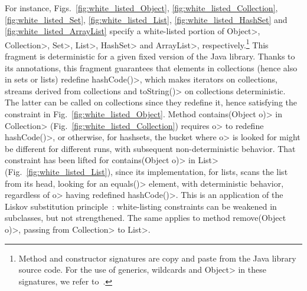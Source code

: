 For instance, Figs.~\ref{fig:white_listed_Object}, \ref{fig:white_listed_Collection},
\ref{fig:white_listed_Set}, \ref{fig:white_listed_List},
\ref{fig:white_listed_HashSet} and \ref{fig:white_listed_ArrayList}
specify a white-listed portion of \<Object>,
\<Collection>, \<Set>, \<List>, \<HashSet> and \<ArrayList>,
respectively.\footnote{Method and constructor signatures are copy and paste from the
Java library source code. For the use of generics, wildcards and
\<Object> in these signatures, we refer to~\cite{NaftalinW06}.}
This fragment is deterministic for a given fixed version of the Java library.
Thanks to its annotations, this fragment guarantees that elements in collections
(hence also in sets or lists) redefine \<hashCode()>, which makes iterators
on collections, streams derived from collections and \<toString()> on collections
deterministic. The latter can be called on collections since they redefine it,
hence satisfying the constraint in Fig.~\ref{fig:white_listed_Object}.
Method \<contains(Object o)> in \<Collection> (Fig.~\ref{fig:white_listed_Collection})
requires \<o> to redefine \<hashCode()>,
or otherwise, for hashsets, the bucket where \<o> is looked for might be different
for different runs, with subsequent non-deterministic behavior.
That constraint has been lifted for \<contains(Object o)> in \<List>
(Fig.~\ref{fig:white_listed_List}), since its implementation, for lists,
scans the list from its head,
looking for an \<equals()> element, with deterministic behavior,
regardless of \<o> having redefined \<hashCode()>. This is an application
of the Liskov substitution principle~\cite{LiskovW94}:
white-listing constraints can be weakened in subclasses,
but not strengthened. The same applies to method \<remove(Object o)>, passing from
\<Collection> to \<List>.

